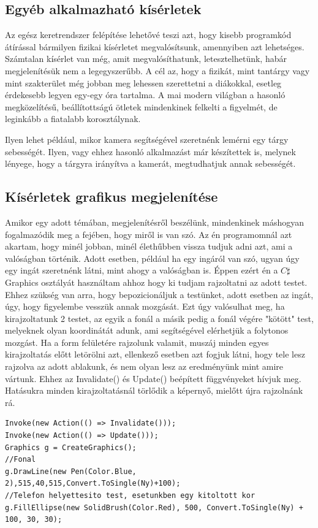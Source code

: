 \documentclass{thesis-ekf}
\theoremstyle{definition}
\theoremstyle{remark}
\begin{document}
\subsection{Egyéb alkalmazható kísérletek}
Az egész keretrendszer felépítése lehetővé teszi azt, hogy kisebb programkód átírással bármilyen fizikai kísérletet megvalósítsunk, amennyiben azt lehetséges. Számtalan kísérlet van még, amit megvalósíthatunk, letesztelhetünk, habár megjelenítésük nem a legegyszerűbb. A cél az, hogy a fizikát, mint tantárgy vagy mint szakterület még jobban meg lehessen szerettetni a diákokkal, esetleg érdekesebb legyen egy-egy óra tartalma. A mai modern világban a hasonló megközelítésű, beállítottságú ötletek mindenkinek felkelti a figyelmét, de leginkább a fiatalabb korosztálynak.
\par Ilyen lehet például, mikor kamera segítségével szeretnénk lemérni egy tárgy sebességét. Ilyen, vagy ehhez hasonló alkalmazást már készítettek is, melynek lényege, hogy a tárgyra irányítva a kamerát, megtudhatjuk annak sebességét.
\subsection{Kísérletek grafikus megjelenítése}
Amikor egy adott témában, megjelenítésről beszélünk, mindenkinek máshogyan fogalmazódik meg a fejében, hogy miről is van szó. Az én programomnál azt akartam, hogy minél jobban, minél élethűbben vissza tudjuk adni azt, ami a valóságban történik. Adott esetben, például ha egy ingáról van szó, ugyan úgy egy ingát szeretnénk látni, mint ahogy a valóságban is. Éppen ezért én a $C\sharp$ Graphics osztályát használtam ahhoz hogy ki tudjam rajzoltatni az adott testet. Ehhez szükség van arra, hogy bepozicionáljuk a testünket, adott esetben az ingát, úgy, hogy figyelembe vesszük annak mozgását. Ezt úgy valósulhat meg, ha kirajzoltatunk 2 testet, az egyik a fonál a másik pedig a fonál végére "kötött" test, melyeknek olyan koordinátát adunk, ami segítségével elérhetjük a folytonos mozgást. Ha a form felületére rajzolunk valamit, muszáj minden egyes kirajzoltatás előtt letörölni azt, ellenkező esetben azt fogjuk látni, hogy tele lesz rajzolva az adott ablakunk, és nem olyan lesz az eredményünk mint amire vártunk. Ehhez az Invalidate() és Update() beépített függvényeket hívjuk meg. Hatásukra minden kirajzoltatásnál törlődik a képernyő, mielőtt újra rajzolnánk rá.
\begin{lstlisting}
Invoke(new Action(() => Invalidate()));
Invoke(new Action(() => Update()));
Graphics g = CreateGraphics();
//Fonal
g.DrawLine(new Pen(Color.Blue, 2),515,40,515,Convert.ToSingle(Ny)+100);
//Telefon helyettesito test, esetunkben egy kitoltott kor
g.FillEllipse(new SolidBrush(Color.Red), 500, Convert.ToSingle(Ny) + 100, 30, 30);
\end{lstlisting}
\end{document}
